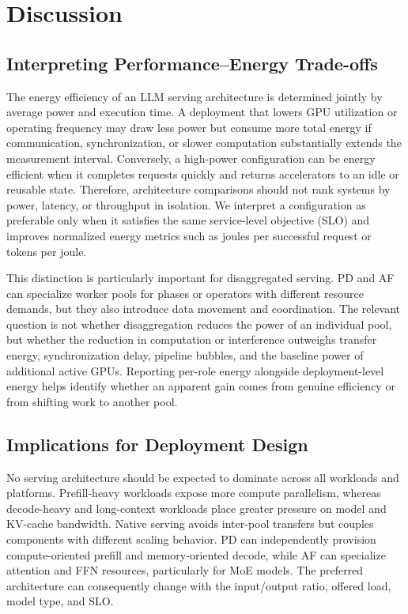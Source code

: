 \section{Discussion}
\label{sec:discussion}

\subsection{Interpreting Performance--Energy Trade-offs}
\label{sec:discussion-tradeoffs}

The energy efficiency of an LLM serving architecture is determined jointly by average power and execution time. A deployment that lowers GPU utilization or operating frequency may draw less power but consume more total energy if communication, synchronization, or slower computation substantially extends the measurement interval. Conversely, a high-power configuration can be energy efficient when it completes requests quickly and returns accelerators to an idle or reusable state. Therefore, architecture comparisons should not rank systems by power, latency, or throughput in isolation. We interpret a configuration as preferable only when it satisfies the same service-level objective (SLO) and improves normalized energy metrics such as joules per successful request or tokens per joule.

This distinction is particularly important for disaggregated serving. PD and AF can specialize worker pools for phases or operators with different resource demands, but they also introduce data movement and coordination. The relevant question is not whether disaggregation reduces the power of an individual pool, but whether the reduction in computation or interference outweighs transfer energy, synchronization delay, pipeline bubbles, and the baseline power of additional active GPUs. Reporting per-role energy alongside deployment-level energy helps identify whether an apparent gain comes from genuine efficiency or from shifting work to another pool.

\subsection{Implications for Deployment Design}
\label{sec:discussion-implications}

No serving architecture should be expected to dominate across all workloads and platforms. Prefill-heavy workloads expose more compute parallelism, whereas decode-heavy and long-context workloads place greater pressure on model and KV-cache bandwidth. Native serving avoids inter-pool transfers but couples components with different scaling behavior. PD can independently provision compute-oriented prefill and memory-oriented decode, while AF can specialize attention and FFN resources, particularly for MoE models. The preferred architecture can consequently change with the input/output ratio, offered load, model type, and SLO.

